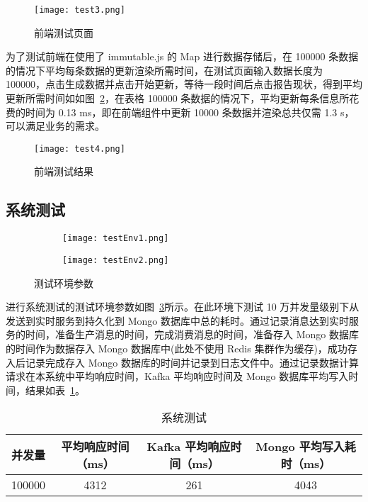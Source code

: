 \begin{figure}[!htp]
    \centering
    \texttt{[image: test3.png]}
    \caption{前端测试页面}
    \label{fig:test3}
  \end{figure}

  为了测试前端在使用了 immutable.js 的 Map 进行数据存储后，在 100000 条数据的情况下平均每条数据的更新渲染所需时间，在测试页面输入数据长度为 100000，点击生成数据并点击开始更新，等待一段时间后点击报告现状，得到平均更新所需时间如如图~\ref{fig:test4}，在表格 100000 条数据的情况下，平均更新每条信息所花费的时间为 0.13 ms，即在前端组件中更新 10000 条数据并渲染总共仅需 1.3 s，可以满足业务的需求。

  \begin{figure}[!htp]
    \centering
    \texttt{[image: test4.png]}
    \caption{前端测试结果}
    \label{fig:test4}
  \end{figure}

  \subsection{系统测试}
  \begin{figure}[!htp]
    \centering
    \begin{subfigure}{0.56\textwidth}
      \centering
      \texttt{[image: testEnv1.png]}
      \caption{}
    \end{subfigure}
    \begin{subfigure}{0.43\textwidth}
      \centering
      \texttt{[image: testEnv2.png]}
      \caption{}
    \end{subfigure}
    \caption{测试环境参数}
    \label{fig:testEnv}
  \end{figure}
  进行系统测试的测试环境参数如图~\ref{fig:testEnv}所示。在此环境下测试 10 万并发量级别下从发送到实时服务到持久化到 Mongo 数据库中总的耗时。通过记录消息达到实时服务的时间，准备生产消息的时间，完成消费消息的时间，准备存入 Mongo 数据库的时间作为数据存入 Mongo 数据库中(此处不使用 Redis 集群作为缓存)，成功存入后记录完成存入 Mongo 数据库的时间并记录到日志文件中。通过记录数据计算请求在本系统中平均响应时间，Kafka 平均响应时间及 Mongo 数据库平均写入时间，结果如表~\ref{fig:test7}。

  \begin{table}[h!]
    \begin{center}
      \caption{系统测试}
      \label{fig:test7}
      \begin{tabular}{ c c c c }
        \hline
        \textbf{并发量} & \textbf{平均响应时间（ms）
        } & \textbf{Kafka 平均响应时间（ms）
        } & \textbf{Mongo 平均写入耗时（ms）
        } \\
        \hline
        100000 & 4312 & 261 & 4043 \\
        \hline
      \end{tabular}
    \end{center}
  \end{table}

